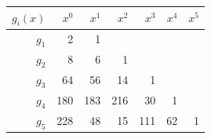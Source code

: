 \begin{center}
\footnotesize
\setlength{\tabcolsep}{4pt}
\renewcommand{\arraystretch}{1.15}
\begin{tabular}{r|rrrrrr}
\toprule
$g_i(x)$ & $x^{0}$ & $x^{1}$ & $x^{2}$ & $x^{3}$ & $x^{4}$ & $x^{5}$ \\
\midrule
$g_{1}$ & 2 & 1 &  &  &  &  \\
$g_{2}$ & 8 & 6 & 1 &  &  &  \\
$g_{3}$ & 64 & 56 & 14 & 1 &  &  \\
$g_{4}$ & 180 & 183 & 216 & 30 & 1 &  \\
$g_{5}$ & 228 & 48 & 15 & 111 & 62 & 1 \\
\bottomrule
\end{tabular}
\end{center}
